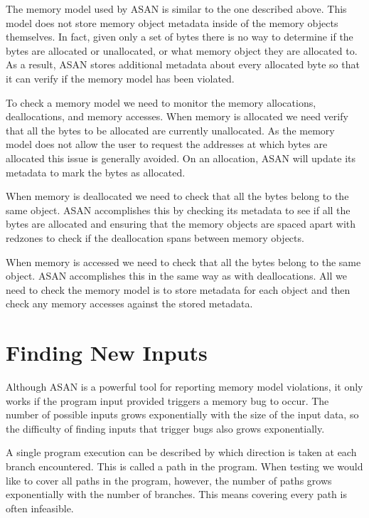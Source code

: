 \documentclass[12pt,twoside]{report}
\begin{document}
The memory model used by ASAN is similar to the one described above. This model does not store memory object metadata inside of the memory objects themselves. In fact, given only a set of bytes there is no way to determine if the bytes are allocated or unallocated, or what memory object they are allocated to. As a result, ASAN stores additional metadata about every allocated byte so that it can verify if the memory model has been violated.

To check a memory model we need to monitor the memory allocations, deallocations, and memory accesses. When memory is allocated we need verify that all the bytes to be allocated are currently unallocated. As the memory model does not allow the user to request the addresses at which bytes are allocated this issue is generally avoided. On an allocation, ASAN will update its metadata to mark the bytes as allocated.

When memory is deallocated we need to check that all the bytes belong to the same object. ASAN accomplishes this by checking its metadata to see if all the bytes are allocated and ensuring that the memory objects are spaced apart with redzones to check if the deallocation spans between memory objects.

When memory is accessed we need to check that all the bytes belong to the same object. ASAN accomplishes this in the same way as with deallocations. All we need to check the memory model is to store metadata for each object and then check any memory accesses against the stored metadata.

\section{Finding New Inputs}
Although ASAN is a powerful tool for reporting memory model violations, it only works if the program input provided triggers a memory bug to occur. The number of possible inputs grows exponentially with the size of the input data, so the difficulty of finding inputs that trigger bugs also grows exponentially.

A single program execution can be described by which direction is taken at each branch encountered. This is called a path in the program. When testing we would like to cover all paths in the program, however, the number of paths grows exponentially with the number of branches. This means covering every path is often infeasible.
\end{document}
